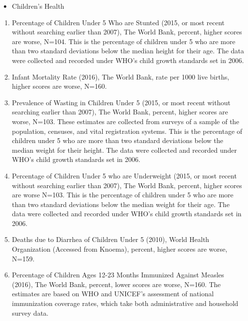 \begin{itemize}
    \item Children's Health
\end{itemize}
\begin{enumerate}
\item Percentage of Children Under 5 Who are Stunted (2015, or most recent without searching earlier than 2007), The World Bank, percent, higher scores are worse, N=104. This is the percentage of children under 5 who are more than two standard deviations below the median height for their age. The data were collected and recorded under WHO's child growth standards set in 2006.
\item Infant Mortality Rate (2016), The World Bank, rate per 1000 live births, higher scores are worse, N=160.
\item Prevalence of Wasting in Children Under 5 (2015, or most recent without searching earlier than 2007), The World Bank, percent, higher scores are worse, N=103. These estimates are collected from surveys of a sample of the population, censuses, and vital registration systems. This is the percentage of children under 5 who are more than two standard deviations below the median weight for their height. The data were collected and recorded under WHO's child growth standards set in 2006.
\item Percentage of Children Under 5 who are Underweight (2015, or most recent without searching earlier than 2007), The World Bank, percent, higher scores are worse N=103. This is the percentage of children under 5 who are more than two standard deviations below the median weight for their age. The data were collected and recorded under WHO's child growth standards set in 2006.
\item Deaths due to Diarrhea of Children Under 5 (2010), World Health Organization (Accessed from Knoema), percent, higher scores are worse, N=159.
\item Percentage of Children Ages 12-23 Months Immunized Against Measles (2016), The World Bank, percent, lower scores are worse, N=160. The estimates are based on WHO and UNICEF's assessment of national immunization coverage rates, which take both administrative and household survey data. 
\end{enumerate}

